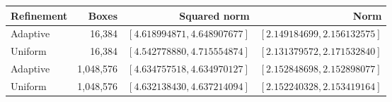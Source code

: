 \begin{tabular}{@{}lrrr@{}}
\toprule
Refinement & Boxes & Squared norm & Norm \\
\midrule
Adaptive & 16,384 & $[4.618994871,4.648907677]$ & $[2.149184699,2.156132575]$ \\
Uniform & 16,384 & $[4.542778880,4.715554874]$ & $[2.131379572,2.171532840]$ \\
Adaptive & 1,048,576 & $[4.634757518,4.634970127]$ & $[2.152848698,2.152898077]$ \\
Uniform & 1,048,576 & $[4.632138430,4.637214094]$ & $[2.152240328,2.153419164]$ \\
\bottomrule
\end{tabular}
